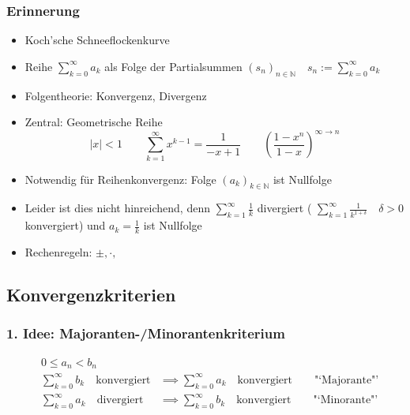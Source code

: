 

\subsubsection*{Erinnerung}
\begin{itemize}
	\item Koch'sche Schneeflockenkurve
	\item Reihe \( \sum_{k=0}^{\infty} a_k \) als Folge der Partialsummen \( (s_n)_{n \in \mathbb{N} } \quad s_n := \sum_{k=0}^{\infty}a_k \)
	\item Folgentheorie: Konvergenz, Divergenz
	\item Zentral: Geometrische Reihe \[
		|x|<1 \qquad \sum_{k=1}^{\infty} x^{k-1} = \frac{1}{-x+1} \qquad \left(\frac{1-x^n}{1-x}\right)^{\infty\rightarrow n}
	\]
	\item Notwendig für Reihenkonvergenz: Folge \( (a_k)_{k \in \mathbb{N}} \) ist Nullfolge
	\item Leider ist dies nicht hinreichend, denn \( \sum_{k=1}^{\infty} \frac{1}{k} \) divergiert ( \(\sum_{k=1}^{\infty}\frac{1}{k^{1+\delta}} \quad   \delta > 0 \) konvergiert) und \( a_k = \frac{1}{k} \) ist Nullfolge
	\item Rechenregeln: \( \pm, \cdot, \) 
\end{itemize}

\subsection*{Konvergenzkriterien}
\subsubsection*{1. Idee: Majoranten-/Minorantenkriterium}
	
\begin{align*}
	& 0 \leq a_n < b_n & \\
	& \sum_{k=0}^{\infty}b_k \quad\text{konvergiert} &\implies \sum_{k=0}^{\infty} a_k \quad\text{konvergiert} \qquad \text{"`Majorante"'} \\
	& \sum_{k=0}^{\infty}a_k \quad\text{divergiert} &\implies \sum_{k=0}^{\infty} b_k \quad\text{konvergiert} \qquad \text{"`Minorante"'}
\end{align*}

